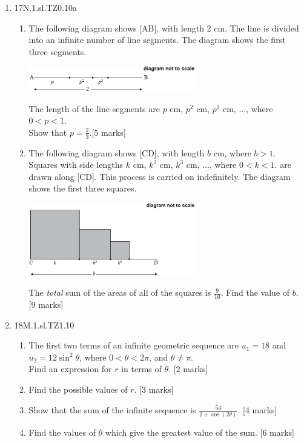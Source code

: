 \documentclass[12pt, twoside]{article}
\begin{document}
\begin{enumerate}
\item 17N.1.sl.TZ0.10a
\begin{enumerate}
  \item The following diagram shows [AB], with length 2 cm. The line is divided into an infinite number of line segments. The diagram shows the first three segments.
  \begin{center}
    \includegraphics[width=0.6\textwidth]{1-1-P1_Algebra-14a.png}
  \end{center}
  The length of the line segments are $p$ cm, $p^2$ cm, $p^3$ cm, ..., where $0<p<1$.\\
  Show that $p=\frac{2}{3}$.[5 marks]
  \item The following diagram shows [CD], with length $b$ cm, where $b>1$. Squares with side lengths $k$ cm, $k^2$ cm, $k^3$ cm, ..., where $0<k<1$. are drawn along [CD]. This process is carried on indefinitely. The diagram shows the first three squares.
  \begin{center}
    \includegraphics[width=0.6\textwidth]{1-1-P1_Algebra-14b.png}
  \end{center}
  The \emph{total} sum of the areas of all of the squares is $\frac{9}{16}$. Find the value of $b$. [9 marks]
\end{enumerate}

\item 18M.1.sl.TZ1.10
\begin{enumerate}
  \item The first two terms of an infinite geometric sequence are $u_1 =18$ and $u_2=12 \sin^2 \theta$, where $0< \theta < 2\pi$, and $\theta \neq \pi$.\\
  Find an expression for $r$ in terms of $\theta$. [2 marks]
  \item Find the possible values of $r$. [3 marks]
  \item Show that the sum of the infinite sequence is $\frac{54}{2+ \cos (2\theta)}$. [4 marks]
  \item Find the values of $\theta$ which give the greatest value of the sum. [6 marks]
\end{enumerate}


\end{enumerate}
\end{document}
